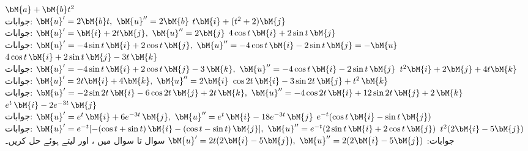 \quad {}\quad
$\bM{a}+\bM{b}t^2$\\
جوابات:
$\bM{u}'=2\bM{b}t,\,\, \bM{u}''=2\bM{b}$
\quad
$t\bM{i}+(t^2+2)\bM{j}$\\
جوابات:
$\bM{u}'=\bM{i}+2t\bM{j},\,\, \bM{u}''=2\bM{j}$
\quad
$4\cos t\,\bM{i}+2\sin t\,\bM{j}$\\
جوابات:
$\bM{u}'=-4\sin t\,\bM{i}+2\cos t\,\bM{j},\,\, \bM{u}''=-4\cos t\,\bM{i}-2\sin t\,\bM{j}=-\bM{u}$
\quad
$4\cos t\,\bM{i}+2\sin t\,\bM{j}-3t\,\bM{k}$\\
جوابات:
$\bM{u}'=-4\sin t\,\bM{i}+2\cos t\,\bM{j}-3\,\bM{k},\,\, \bM{u}''=-4\cos t\,\bM{i}-2\sin t\,\bM{j}$
\quad
$t^2\bM{i}+2 \bM{j}+4t\bM{k}$\\
جوابات:
$\bM{u}'=2t\bM{i}+4\bM{k},\,\, \bM{u}''=2\bM{i}$
\quad
$\cos 2t\, \bM{i}-3\sin 2t \,\bM{j}+t^2\,\bM{k}$\\
جوابات:
$\bM{u}'=-2\sin 2t\,\bM{i}-6\cos 2t\,\bM{j}+2t\,\bM{k},\,\, \bM{u}''=-4\cos 2t\,\bM{i}+12\sin 2t\,\bM{j}+2\,\bM{k}$
\quad
$e^{t}\, \bM{i}-2e^{-3t} \,\bM{j}$\\
جوابات:
$\bM{u}'=e^t\,\bM{i}+6e^{-3t}\,\bM{j},\,\, \bM{u}''=e^t\,\bM{i}-18e^{-3t}\,\bM{j}$
\quad
$e^{-t}(\cos t\, \bM{i}-\sin t \,\bM{j})$\\
جوابات:
$\bM{u}'=e^{-t}[-(\cos t+\sin t)\,\bM{i}-(\cos t-\sin t)\,\bM{j}],\,\, \bM{u}''=e^{-t}(2\sin t \,\bM{i}+2\cos t \,\bM{j})$
\quad
$t^2(2\bM{i}-5\bM{j})$\\
جوابات:
$\bM{u}'=2t(2\bM{i}-5\bM{j}),\,\, \bM{u}''=2(2\bM{i}-5\bM{j})$
سوال  تا سوال  میں ،
  اور  لیتے ہوئے حل کریں۔

